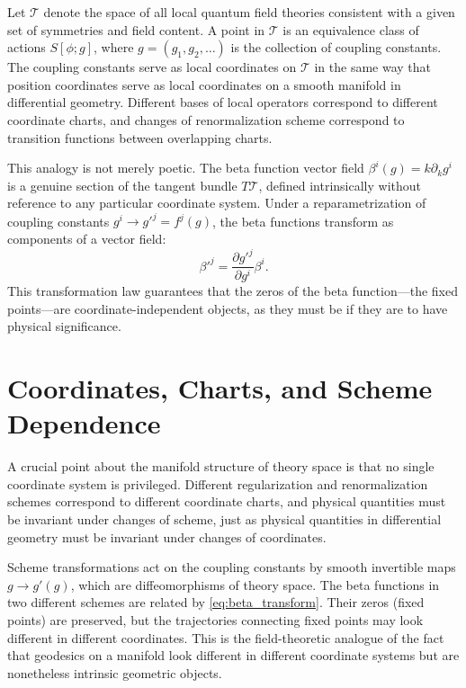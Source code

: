 \documentclass[11pt, twoside, openright]{book}
\theoremstyle{dotted}
\theoremstyle{definition}
\newcommand{\cT}{\mathcal{T}}          %
\begin{document}
Let $\cT$ denote the space of all local quantum field theories consistent with
a given set of symmetries and field content. A point in $\cT$ is an equivalence
class of actions $S[\phi; g]$, where $g = (g_1, g_2, \ldots)$ is the collection
of coupling constants. The coupling constants serve as local coordinates on $\cT$
in the same way that position coordinates serve as local coordinates on a smooth
manifold in differential geometry. Different bases of local operators correspond
to different coordinate charts, and changes of renormalization scheme correspond
to transition functions between overlapping charts.

This analogy is not merely poetic. The beta function vector field $\beta^i(g) =
k\partial_k g^i$ is a genuine section of the tangent bundle $T\cT$, defined
intrinsically without reference to any particular coordinate system. Under a
reparametrization of coupling constants $g^i \to g'^j = f^j(g)$, the beta
functions transform as components of a vector field:
\begin{equation}
  \beta'^j = \frac{\partial g'^j}{\partial g^i}\beta^i.
  \label{eq:beta_transform}
\end{equation}
This transformation law guarantees that the zeros of the beta function---the
fixed points---are coordinate-independent objects, as they must be if they are
to have physical significance.

\section{Coordinates, Charts, and Scheme Dependence}

A crucial point about the manifold structure of theory space is that no single
coordinate system is privileged. Different regularization and renormalization
schemes correspond to different coordinate charts, and physical quantities must
be invariant under changes of scheme, just as physical quantities in differential
geometry must be invariant under changes of coordinates.

Scheme transformations act on the coupling constants by smooth invertible maps
$g \to g'(g)$, which are diffeomorphisms of theory space. The beta functions
in two different schemes are related by \eqref{eq:beta_transform}. Their zeros
(fixed points) are preserved, but the trajectories connecting fixed points may
look different in different coordinates. This is the field-theoretic analogue of
the fact that geodesics on a manifold look different in different coordinate systems
but are nonetheless intrinsic geometric objects.
\end{document}
